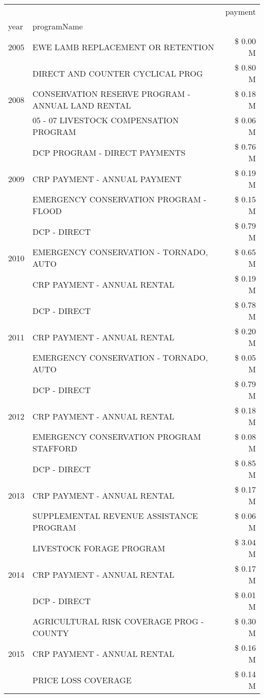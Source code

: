 \begin{tabular}{llr}
\toprule
 &  & payment \\
year & programName &  \\
\midrule
2005 & EWE LAMB REPLACEMENT OR RETENTION & \$ 0.00 M \\
\cline{1-3}
\multirow[t]{3}{*}{2008} & DIRECT AND COUNTER CYCLICAL PROG & \$ 0.80 M \\
 & CONSERVATION RESERVE PROGRAM - ANNUAL LAND RENTAL & \$ 0.18 M \\
 & 05 - 07 LIVESTOCK COMPENSATION PROGRAM & \$ 0.06 M \\
\cline{1-3}
\multirow[t]{3}{*}{2009} & DCP PROGRAM - DIRECT PAYMENTS & \$ 0.76 M \\
 & CRP PAYMENT - ANNUAL PAYMENT & \$ 0.19 M \\
 & EMERGENCY CONSERVATION PROGRAM - FLOOD & \$ 0.15 M \\
\cline{1-3}
\multirow[t]{3}{*}{2010} & DCP - DIRECT & \$ 0.79 M \\
 & EMERGENCY CONSERVATION - TORNADO, AUTO & \$ 0.65 M \\
 & CRP PAYMENT - ANNUAL RENTAL & \$ 0.19 M \\
\cline{1-3}
\multirow[t]{3}{*}{2011} & DCP - DIRECT & \$ 0.78 M \\
 & CRP PAYMENT - ANNUAL RENTAL & \$ 0.20 M \\
 & EMERGENCY CONSERVATION - TORNADO, AUTO & \$ 0.05 M \\
\cline{1-3}
\multirow[t]{3}{*}{2012} & DCP - DIRECT & \$ 0.79 M \\
 & CRP PAYMENT - ANNUAL RENTAL & \$ 0.18 M \\
 & EMERGENCY CONSERVATION PROGRAM STAFFORD & \$ 0.08 M \\
\cline{1-3}
\multirow[t]{3}{*}{2013} & DCP - DIRECT & \$ 0.85 M \\
 & CRP PAYMENT - ANNUAL RENTAL & \$ 0.17 M \\
 & SUPPLEMENTAL REVENUE ASSISTANCE PROGRAM & \$ 0.06 M \\
\cline{1-3}
\multirow[t]{3}{*}{2014} & LIVESTOCK FORAGE PROGRAM & \$ 3.04 M \\
 & CRP PAYMENT - ANNUAL RENTAL & \$ 0.17 M \\
 & DCP - DIRECT & \$ 0.01 M \\
\cline{1-3}
\multirow[t]{3}{*}{2015} & AGRICULTURAL RISK COVERAGE PROG - COUNTY & \$ 0.30 M \\
 & CRP PAYMENT - ANNUAL RENTAL & \$ 0.16 M \\
 & PRICE LOSS COVERAGE & \$ 0.14 M \\

\end{tabular}
